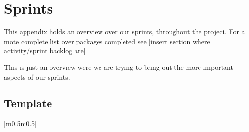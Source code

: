 \chapter{Sprints}
\label{chap:sprints}

This appendix holds an overview over our sprints, throughout the
project. For a mote complete list over packages completed see [insert
section where activity/sprint backlog are]

This is just an overview were we are trying to bring out the more
important aspects of our sprints. 

\section{Template}
\begin{center}
\begin{supertabular}{|m{0.5\textwidth}m{0.5\textwidth}|}
\\\hline
{}\\\hline
{}\\\hline
{}\\\hline
{}\\\hline
\end{supertabular}
\end{center}
\clearpage

